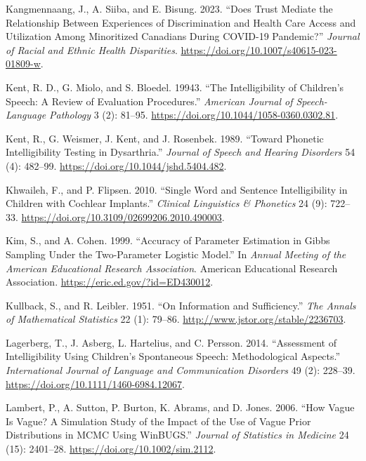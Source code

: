 \documentclass[
sn-apacite
]{sn-jnl}
\newlength{\cslhangindent}
\newenvironment{CSLReferences}[2] %
 {\begin{list}{}{%
  \setlength{\itemindent}{0pt}
  \setlength{\leftmargin}{0pt}
  \setlength{\parsep}{0pt}
  \ifodd #1
   \setlength{\leftmargin}{\cslhangindent}
   \setlength{\itemindent}{-1\cslhangindent}
  \fi
  \setlength{\itemsep}{#2\baselineskip}}}
 {\end{list}}
\begin{document}
\begin{CSLReferences}{1}{0}
Kangmennaang, J., A. Siiba, and E. Bisung. 2023. {``Does Trust Mediate
the Relationship Between Experiences of Discrimination and Health Care
Access and Utilization Among Minoritized Canadians During COVID-19
Pandemic?''} \emph{Journal of Racial and Ethnic Health Disparities}.
\url{https://doi.org/10.1007/s40615-023-01809-w}.

Kent, R. D., G. Miolo, and S. Bloedel. 19943. {``The Intelligibility of
Children's Speech: A Review of Evaluation Procedures.''} \emph{American
Journal of Speech-Language Pathology} 3 (2): 81--95.
\url{https://doi.org/10.1044/1058-0360.0302.81}.

Kent, R., G. Weismer, J. Kent, and J. Rosenbek. 1989. {``Toward Phonetic
Intelligibility Testing in Dysarthria.''} \emph{Journal of Speech and
Hearing Disorders} 54 (4): 482--99.
\url{https://doi.org/10.1044/jshd.5404.482}.

Khwaileh, F., and P. Flipsen. 2010. {``Single Word and Sentence
Intelligibility in Children with Cochlear Implants.''} \emph{Clinical
Linguistics \& Phonetics} 24 (9): 722--33.
\url{https://doi.org/10.3109/02699206.2010.490003}.

Kim, S., and A. Cohen. 1999. {``Accuracy of Parameter Estimation in
Gibbs Sampling Under the Two-Parameter Logistic Model.''} In
\emph{Annual Meeting of the American Educational Research Association}.
American Educational Research Association.
\url{https://eric.ed.gov/?id=ED430012}.

Kullback, S., and R. Leibler. 1951. {``On Information and
Sufficiency.''} \emph{The Annals of Mathematical Statistics} 22 (1):
79--86. \url{http://www.jstor.org/stable/2236703}.

Lagerberg, T., J. Asberg, L. Hartelius, and C. Persson. 2014.
{``Assessment of Intelligibility Using Children's Spontaneous Speech:
Methodological Aspects.''} \emph{International Journal of Language and
Communication Disorders} 49 (2): 228--39.
\url{https://doi.org/10.1111/1460-6984.12067}.

Lambert, P., A. Sutton, P. Burton, K. Abrams, and D. Jones. 2006. {``How
Vague Is Vague? A Simulation Study of the Impact of the Use of Vague
Prior Distributions in MCMC Using WinBUGS.''} \emph{Journal of
Statistics in Medicine} 24 (15): 2401--28.
\url{https://doi.org/10.1002/sim.2112}.


\end{CSLReferences}
\end{document}
